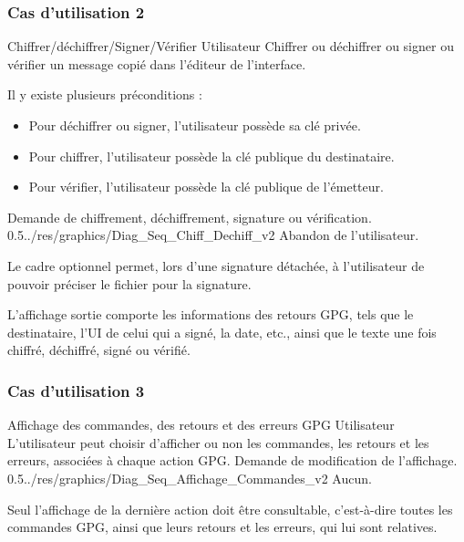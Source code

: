 \documentclass{../res/univ-projet}
\begin{document}
\subsubsection{Cas d'utilisation 2}
\ficheGraphic
{Chiffrer/déchiffrer/Signer/Vérifier}
{Utilisateur}
{Chiffrer ou déchiffrer ou signer ou vérifier un message copié dans l'éditeur de l'interface.}
{
  Il y existe plusieurs préconditions :
  \begin{itemize}
    \item Pour déchiffrer ou signer, l'utilisateur possède sa clé privée.
    \item Pour chiffrer, l'utilisateur possède la clé publique du destinataire.
    \item Pour vérifier, l'utilisateur possède la clé publique de l'émetteur.
  \end{itemize}
}
{Demande de chiffrement, déchiffrement, signature ou vérification.}
{}
{0.5}{../res/graphics/Diag_Seq_Chiff_Dechiff_v2}
{Abandon de l'utilisateur.}
\vspace{0.5cm}

Le cadre optionnel permet, lors d'une signature détachée, à l'utilisateur de pouvoir préciser le fichier pour la signature.

L'affichage sortie comporte les informations des retours GPG, tels que le destinataire, l'UI de celui qui a signé, la date, etc., ainsi que le texte une fois chiffré, déchiffré, signé ou vérifié.

\subsubsection{Cas d'utilisation 3}
\ficheGraphic
{Affichage des commandes, des retours et des erreurs GPG}
{Utilisateur}
{L'utilisateur peut choisir d'afficher ou non les commandes, les retours et les erreurs, associées à chaque action GPG.}
{}
{Demande de modification de l'affichage.}
{}
{0.5}{../res/graphics/Diag_Seq_Affichage_Commandes_v2}
{Aucun.}   
\vspace{0.5cm}

Seul l'affichage de la dernière action doit être consultable, c'est-à-dire toutes les commandes GPG, ainsi que leurs retours et les erreurs, qui lui sont relatives.
\end{document}
